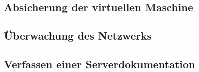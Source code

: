 \hypertarget{absicherung-der-virtuellen-maschine}{%
\subsection{Absicherung der virtuellen
Maschine}\label{absicherung-der-virtuellen-maschine}}

\hypertarget{uxfcberwachung-des-netzwerks}{%
\subsection{Überwachung des
Netzwerks}\label{uxfcberwachung-des-netzwerks}}

\hypertarget{verfassen-einer-serverdokumentation}{%
\subsection{Verfassen einer
Serverdokumentation}\label{verfassen-einer-serverdokumentation}}
